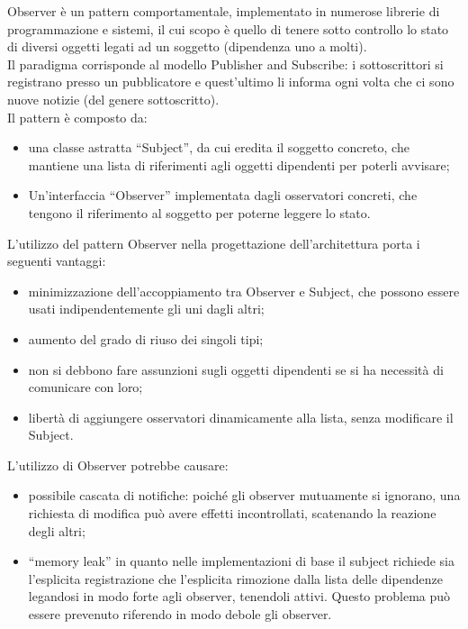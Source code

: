 	 \label{app:observer}
		Observer è un pattern comportamentale, implementato in numerose librerie di programmazione e sistemi, il cui scopo è quello di tenere sotto controllo lo stato di diversi oggetti legati ad un soggetto (dipendenza uno a molti). \\
		Il paradigma corrisponde al modello Publisher and Subscribe: i sottoscrittori si registrano presso un pubblicatore e quest’ultimo li informa ogni volta che ci sono nuove notizie (del genere sottoscritto).\\
		Il pattern è composto da:
		\begin{itemize}
		\item una classe astratta “Subject”, da cui eredita il soggetto concreto, che mantiene una lista di riferimenti agli oggetti dipendenti per poterli avvisare;
		\item Un’interfaccia “Observer” implementata dagli osservatori concreti, che tengono il riferimento al soggetto per poterne leggere lo stato.
		\end{itemize}
			L’utilizzo del pattern Observer nella progettazione dell’architettura porta i seguenti vantaggi:
			\begin{itemize}
			\item minimizzazione dell’accoppiamento tra Observer e Subject, che possono essere usati indipendentemente gli uni dagli altri;
			\item aumento del grado di riuso dei singoli tipi;
			\item non si debbono fare assunzioni sugli oggetti dipendenti se si ha necessità di comunicare con loro;
			\item libertà di aggiungere osservatori dinamicamente alla lista, senza modificare il Subject.
			\end{itemize}

			L’utilizzo di Observer potrebbe causare:
			\begin{itemize}
			\item possibile cascata di notifiche: poiché gli observer mutuamente si ignorano, una richiesta di modifica può avere effetti incontrollati, scatenando la reazione degli altri;
			\item “memory leak” in quanto nelle implementazioni di base il subject richiede sia l’esplicita registrazione che l’esplicita rimozione dalla lista delle dipendenze legandosi in modo forte agli observer, tenendoli attivi. Questo problema può essere prevenuto riferendo in modo debole gli observer.
			\end{itemize}
